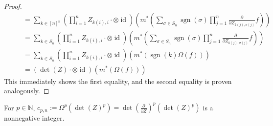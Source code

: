 \begin{proof}
\begin{equation}
\begin{aligned}
      &&&= \sum_{k \in [ n ]^n} \left( \prod_{i=1}^n Z_{k(i),i} {\cdot} \otimes \operatorname{id} \right) \left( m^\ast \left( \sum_{\sigma \in S_n} \operatorname{sgn} \left( \sigma \right) \prod_{j=1}^n \frac{\partial}{\partial Z_{k(j),\sigma (j)}} f \right) \right) \\
      &&&= \sum_{k \in S_n} \left( \prod_{i=1}^n Z_{k(i),i} {\cdot} \otimes \operatorname{id} \right) \left( m^\ast \left( \sum_{\sigma \in S_n} \operatorname{sgn} \left( \sigma \right) \prod_{j=1}^n \frac{\partial}{\partial Z_{k(j),\sigma (j)}} f \right) \right) \\
      &&&= \sum_{k \in S_n} \left( \prod_{i=1}^n Z_{k(i),i} {\cdot} \otimes \operatorname{id} \right) \left( m^\ast \left( \operatorname{sgn} (k) \Omega (f) \right) \right)\\
      &&&= \left( \operatorname{det} (Z) {\cdot} \otimes \operatorname{id} \right) \left( m^\ast \left( \Omega (f) \right) \right)
    \end{aligned}
  \end{equation}
  This immediately shows the first equality, and the second equality is proven analogously.
\end{proof}

\begin{lemma}
  For $p \in \mathbb{N} $, $ c_{p,n} := \Omega^p \left( \operatorname{det} (Z)^p \right) = \operatorname{det} \left( \frac{\partial}{\partial Z}\right)^p \left( \operatorname{det} (Z)^p \right)$ is a nonnegative integer.
\end{lemma}

